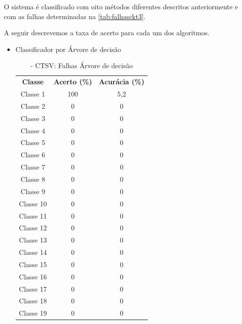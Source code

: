 O sistema é classificado com oito métodos diferentes descritos anteriormente e com as falhas determinadas na \ref{tab:falhasckt3}. 

A seguir descrevemos a taxa de acerto para cada um dos algoritmos. 
\newpage

\begin{itemize}

 \item Classificador por Árvore de decisão
 
\begin{table}[ht]
\centering
\begin{tabular}{ccc}
\textbf{Classe} & \textbf{Acerto (\%)} & \textbf{Acurácia (\%)} \\
Classe 1        & 100                  & 5,2                    \\
Classe 2        & 0                 & 0                   \\
Classe 3       & 0                 & 0                     \\
Classe 4       & 0                 & 0                     \\
Classe 5        & 0                 & 0                     \\
Classe 6        & 0                 & 0                      \\
Classe 7        & 0                 & 0                      \\
Classe 8        & 0                 & 0                     \\
Classe 9        & 0                 & 0                     \\
Classe 10       & 0                 & 0                     \\
Classe 11      & 0                 & 0      
     \\
Classe 12       & 0                 & 0   
     \\
Classe 13      & 0                 & 0    
     \\
Classe 14       & 0                 & 0   
     \\
Classe 15       & 0                 & 0    
     \\
Classe 16       & 0                 & 0   
     \\
Classe 17       & 0                 & 0   
     \\
Classe 18     & 0                 & 0    
     \\
Classe 19       & 0                 & 0   
\end{tabular}
\caption{\label{tab:ctsvnarvore}- CTSV: Falhas Árvore de decisão}
\end{table}


\end{itemize}
